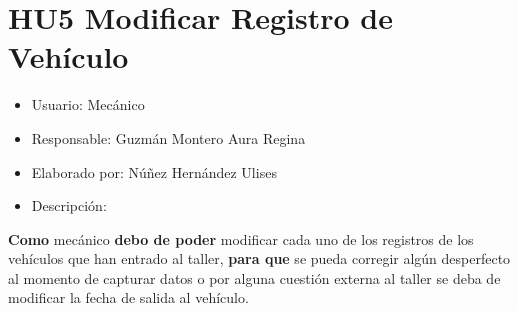 \section{HU5 Modificar Registro de Vehículo}
\begin{itemize}
	\item Usuario: Mecánico
	\item Responsable: Guzmán Montero Aura Regina
	\item Elaborado por: Núñez Hernández Ulises
	\item Descripción:\\
\end{itemize}

\textbf{Como} mecánico \textbf{debo de poder} modificar cada uno de los registros de los vehículos que han entrado al taller, \textbf{para que} se pueda corregir algún desperfecto al momento de capturar datos o por alguna cuestión externa al taller se deba de modificar la fecha de salida al vehículo.